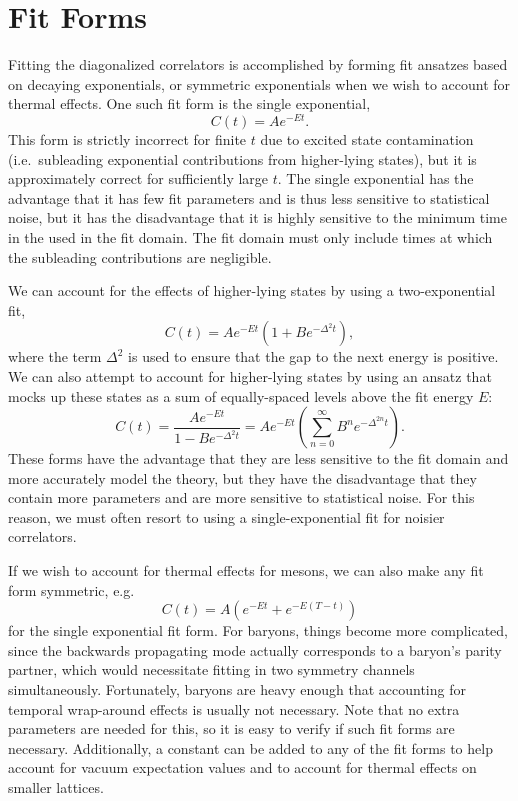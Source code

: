 \section{Fit Forms}\label{sec:fit_forms}
Fitting the diagonalized correlators is accomplished by forming fit ansatzes based on decaying exponentials, or symmetric exponentials when we wish to account for thermal effects. One such fit form is the single exponential,
\begin{equation}\label{eq:single_exp}
    C(t) = Ae^{-E t}.
\end{equation}
This form is strictly incorrect for finite $t$ due to excited state contamination (i.e.\ subleading exponential contributions from higher-lying states), but it is approximately correct for sufficiently large $t$. The single exponential has the advantage that it has few fit parameters and is thus less sensitive to statistical noise, but it has the disadvantage that it is highly sensitive to the minimum time in the used in the fit domain. The fit domain must only include times at which the subleading contributions are negligible.

We can account for the effects of higher-lying states by using a two-exponential fit,
\begin{equation}
    C(t)=A e^{-E t}\left(1+B e^{-\Delta^{2} t}\right),
\end{equation}
where the term $\Delta^2$ is used to ensure that the gap to the next energy is positive. We can also attempt to account for higher-lying states by using an ansatz that mocks up these states as a sum of equally-spaced levels above the fit energy $E$:
\begin{equation}
    C(t)=\frac{A e^{-E t}}{1-B e^{-\Delta^{2} t}} = Ae^{-Et}\left(\sum_{n=0}^\infty B^n e^{-\Delta^{2n}t}\right).
\end{equation}
These forms have the advantage that they are less sensitive to the fit domain and more accurately model the theory, but they have the disadvantage that they contain more parameters and are more sensitive to statistical noise. For this reason, we must often resort to using a single-exponential fit for noisier correlators.

If we wish to account for thermal effects for mesons, we can also make any fit form symmetric, e.g.\
\begin{equation}
    C(t)=A\left(e^{-E t}+e^{-E(T-t)}\right)
\end{equation}
for the single exponential fit form. For baryons, things become more complicated, since the backwards propagating mode actually corresponds to a baryon's parity partner, which would necessitate fitting in two symmetry channels simultaneously. Fortunately, baryons are heavy enough that accounting for temporal wrap-around effects is usually not necessary. Note that no extra parameters are needed for this, so it is easy to verify if such fit forms are necessary. Additionally, a constant can be added to any of the fit forms to help account for vacuum expectation values and to account for thermal effects on smaller lattices.
